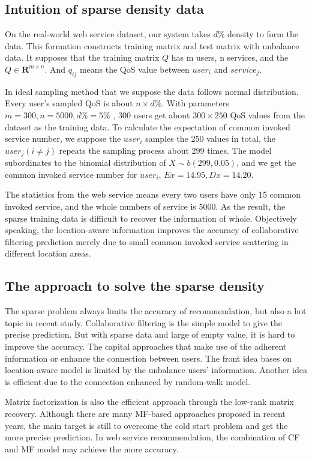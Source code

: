 \documentclass[conference]{IEEEtran}
\begin{document}
\subsection{Intuition of sparse density data}
\par On the real-world web service dataset\cite{zheng_wsrec:_2009}, our system takes $d \%$ density to form the data. This formation constructs training matrix and test matrix with unbalance data. It supposes that the training matrix $Q$ has m users, n services, and the $Q\in \textbf{R}^{m\times n}$. And $q_{ij}$ means the QoS value between $user_{i}$ and $service_{j}$. 
\par In ideal sampling method that we suppose the data follows normal distribution. Every user's sampled QoS is about $n\times d \% $. With parameters $ m=300 , n=5000 , d\%=5\% $ , 300 users get about $ 300 \times 250 $ QoS values from the dataset as the training data. To calculate the expectation of common invoked service number, we suppose the $user_i$ samples the 250 values in total, the $user_j (i \neq j)$ repeats the sampling process about 299 times. The model subordinates to the binomial distribution of $X \sim b(299,0.05)$, and we get the common invoked service number for $user_i$, $Ex=14.95,Dx=14.20$. 
\par The statistics from the web service means every two users have only 15 common invoked service, and the whole numbers of service is 5000. As the result, the sparse training data is difficult to recover the information of whole. Objectively speaking, the location-aware\cite{liu_location-aware_2016}  information improves the accuracy of collaborative filtering prediction merely due to small common invoked service scattering in different location areas.

\subsection{The approach to solve the sparse density}
\par The sparse problem always limits the accuracy of recommendation, but  also a hot topic in recent study. Collaborative filtering is the simple model to give the precise prediction. But with sparse data and large of empty value, it is hard to improve the accuracy. The capital approaches that make use of the adherent information or enhance the connection between users. The front idea bases on location-aware model is limited by the unbalance users' information. Another idea is efficient due to the connection enhanced by random-walk model. 
\par Matrix factorization is also the efficient approach through the low-rank matrix recovery\cite{choi_statistical_2015}\cite{agarwal_stochastic_2014}. Although there are many MF-based approaches\cite{zhou_qos-aware_2015}\cite{tran_low-rank_2016} proposed in recent years, the main target is still to overcome the cold start problem\cite{ongie_fast_2017} and get the more precise prediction. In web service recommendation, the combination of CF and MF model\cite{koren_matrix_2009} may achieve the more accuracy.      
\end{document}
